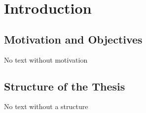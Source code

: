 \chapter{Introduction}
\label{chapter:Introduction}

\section{Motivation and Objectives}
\label{sec:motivation}
No text without motivation


\section{Structure of the Thesis}
\label{sec:structure-thesis}
No text without a structure




 


